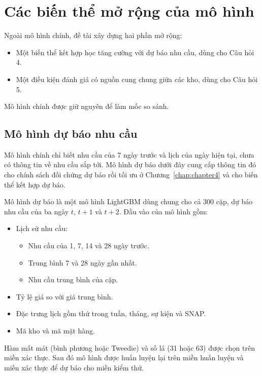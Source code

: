 \section{Các biến thể mở rộng của mô hình}
\label{sec:bienThe}

Ngoài mô hình chính, đề tài xây dựng hai phần mở rộng:
\begin{itemize}
    \item Một biến thể kết hợp học tăng cường với dự báo nhu cầu, dùng cho Câu hỏi 4.
    \item Một điều kiện đánh giá có nguồn cung chung giữa các kho, dùng cho Câu hỏi 5.
\end{itemize}

Mô hình chính được giữ nguyên để làm mốc so sánh.

\subsection{Mô hình dự báo nhu cầu}
\label{subsec:bienTheDuBao}

Mô hình chính chỉ biết nhu cầu của 7 ngày trước và lịch của ngày hiện tại, chưa có thông tin về nhu cầu sắp tới. Mô hình dự báo dưới đây cung cấp thông tin đó cho chính sách đối chứng dự báo rồi tối ưu ở Chương~\ref{chap:chapter4} và cho biến thể kết hợp dự báo.

Mô hình dự báo là một mô hình LightGBM dùng chung cho cả 300 cặp, dự báo nhu cầu của ba ngày $t$, $t+1$ và $t+2$. Đầu vào của mô hình gồm:
\begin{itemize}
    \item Lịch sử nhu cầu:
    \begin{itemize}
        \item Nhu cầu của 1, 7, 14 và 28 ngày trước.
        \item Trung bình 7 và 28 ngày gần nhất.
        \item Nhu cầu trung bình của cặp.
    \end{itemize}
    \item Tỷ lệ giá so với giá trung bình.
    \item Đặc trưng lịch gồm thứ trong tuần, tháng, sự kiện và SNAP.
    \item Mã kho và mã mặt hàng.
\end{itemize}

Hàm mất mát (bình phương hoặc Tweedie) và số lá (31 hoặc 63) được chọn trên miền xác thực. Sau đó mô hình được huấn luyện lại trên miền huấn luyện và miền xác thực để dự báo cho miền kiểm thử.

